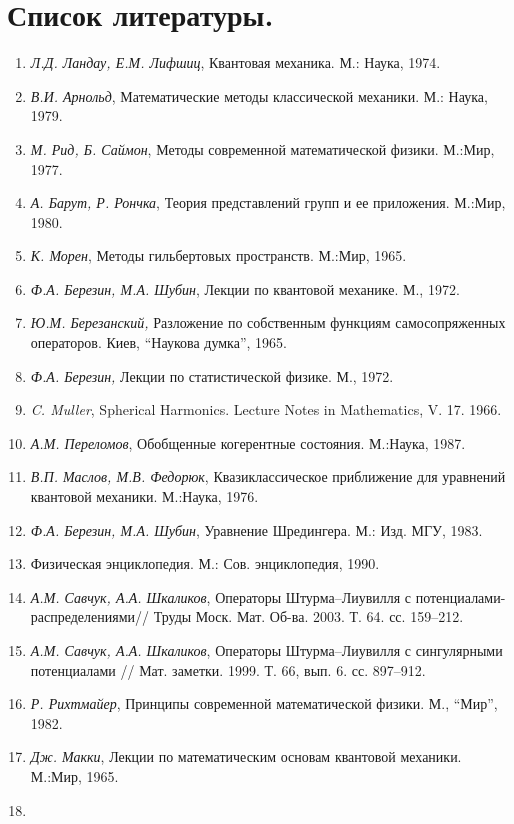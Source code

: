 \documentclass[a4paper
]{article}
\begin{document}
\section{Список литературы.}
\begin{enumerate}
\item {\it  Л.Д. Ландау, Е.М. Лифшиц}, Квантовая механика. М.:
Наука, 1974. \item {\it В.И. Арнольд}, Математические методы
классической механики. М.: Наука, 1979. \item {\it М. Рид, Б.
Саймон}, Методы современной математической физики. М.:Мир, 1977.
\item {\it А. Барут, Р. Рончка}, Теория представлений групп и ее
приложения. М.:Мир, 1980. \item {\it К. Морен}, Методы
гильбертовых пространств.  М.:Мир, 1965. \item {\it Ф.А. Березин,
М.А. Шубин}, Лекции по квантовой механике. М., 1972. \item {\it
Ю.М. Березанский,} Разложение по собственным функциям
самосопряженных операторов. Киев, ``Наукова думка'', 1965. \item
{\it  Ф.А. Березин,} Лекции по статистической физике. М., 1972.
\item {\it C. Muller}, Spherical Harmonics. Lecture Notes in
Mathematics, V. 17. 1966. \item {\it  А.М. Переломов}, Обобщенные
когерентные состояния. М.:Наука, 1987. \item {\it  В.П. Маслов,
М.В. Федорюк}, Квазиклассическое приближение для уравнений
квантовой механики. М.:Наука, 1976. \item {\it  Ф.А. Березин, М.А.
Шубин}, Уравнение Шредингера. М.: Изд. МГУ, 1983.
\item Физическая энциклопедия. М.:
Сов. энциклопедия, 1990. \item {\it  А.М. Савчук,  А.А. Шкаликов},
Операторы Штурма--Лиувилля с потенциалами-распределениями// Труды
Моск. Мат. Об-ва. 2003. Т. 64. сс. 159--212. \item {\it  А.М.
Савчук, А.А. Шкаликов},  Операторы Штурма--Лиувилля с сингулярными
потенциалами // Мат. заметки. 1999. Т. 66, вып. 6. сс. 897--912.
\item {\it  Р. Рихтмайер}, Принципы современной математической
физики. М., ``Мир'', 1982. \item {\it Дж. Макки}, Лекции по
математическим основам квантовой механики. М.:Мир, 1965. \item

\end{enumerate}
\end{document}
